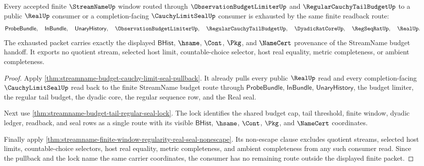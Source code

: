 \begin{theorem}
\label{thm:streamname-budget-regular-readback-exhaustion}
Every accepted finite $\StreamNameUp$ window routed through
$\ObservationBudgetLimiterUp$ and $\RegularCauchyTailBudgetUp$ to a public
$\RealUp$ consumer or a completion-facing $\CauchyLimitSealUp$ consumer is
exhausted by the same finite readback route:
$$
\mathsf{ProbeBundle},\quad \mathsf{InBundle},\quad
\mathsf{UnaryHistory},\quad \ObservationBudgetLimiterUp,\quad
\RegularCauchyTailBudgetUp,\quad \DyadicRatCoreUp,\quad
\RegSeqRatUp,\quad \RealUp.
$$
The exhausted packet carries exactly the displayed $\mathsf{BHist}$, $\hsame$,
$\Cont$, $\Pkg$, and $\NameCert$ provenance of the StreamName budget handoff.
It exports no quotient stream, selected host limit, countable-choice selector,
host real equality, metric completeness, or ambient completeness.
\end{theorem}
\begin{proof}
Apply \autoref{thm:streamname-budget-cauchy-limit-seal-pullback}. It already
pulls every public $\RealUp$ read and every completion-facing
$\CauchyLimitSealUp$ read back to the finite StreamName budget route through
$\mathsf{ProbeBundle}$, $\mathsf{InBundle}$, $\mathsf{UnaryHistory}$, the
budget limiter, the regular tail budget, the dyadic core, the regular sequence
row, and the Real seal.

Next use \autoref{thm:streamname-budget-tail-regular-seal-lock}. The lock
identifies the shared budget cap, tail threshold, finite window, dyadic ledger,
readback, and seal rows as a single route with its visible $\mathsf{BHist}$,
$\hsame$, $\Cont$, $\Pkg$, and $\NameCert$ coordinates.

Finally apply
\autoref{thm:streamname-finite-window-regularity-real-seal-nonescape}. Its
non-escape clause excludes quotient streams, selected host limits,
countable-choice selectors, host real equality, metric completeness, and
ambient completeness from any such consumer read. Since the pullback and the
lock name the same carrier coordinates, the consumer has no remaining route
outside the displayed finite packet.
\end{proof}

